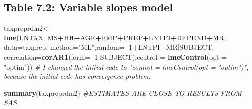\documentclass[]{book}
\newenvironment{Shaded}{\begin{snugshade}}{\end{snugshade}}
\newcommand{\CommentTok}[1]{\textcolor[rgb]{0.56,0.35,0.01}{\textit{#1}}}
\newcommand{\DataTypeTok}[1]{\textcolor[rgb]{0.13,0.29,0.53}{#1}}
\newcommand{\DecValTok}[1]{\textcolor[rgb]{0.00,0.00,0.81}{#1}}
\newcommand{\KeywordTok}[1]{\textcolor[rgb]{0.13,0.29,0.53}{\textbf{#1}}}
\newcommand{\NormalTok}[1]{#1}
\newcommand{\OperatorTok}[1]{\textcolor[rgb]{0.81,0.36,0.00}{\textbf{#1}}}
\newcommand{\StringTok}[1]{\textcolor[rgb]{0.31,0.60,0.02}{#1}}
\begin{document}
\hypertarget{table-7.2-variable-slopes-model}{%
\subsection{Table 7.2: Variable slopes model}\label{table-7.2-variable-slopes-model}}

\begin{Shaded}
\begin{Highlighting}[]
\NormalTok{taxpreprdm2<-}\KeywordTok{lme}\NormalTok{(LNTAX}\OperatorTok{~}\NormalTok{MS}\OperatorTok{+}\NormalTok{HH}\OperatorTok{+}\NormalTok{AGE}\OperatorTok{+}\NormalTok{EMP}\OperatorTok{+}\NormalTok{PREP}\OperatorTok{+}\NormalTok{LNTPI}\OperatorTok{+}\NormalTok{DEPEND}\OperatorTok{+}\NormalTok{MR, }\DataTypeTok{data=}\NormalTok{taxprep, }\DataTypeTok{method=}\StringTok{"ML"}\NormalTok{,}\DataTypeTok{random=}\OperatorTok{~}\DecValTok{1}\OperatorTok{+}\NormalTok{LNTPI}\OperatorTok{+}\NormalTok{MR}\OperatorTok{|}\NormalTok{SUBJECT, }\DataTypeTok{correlation=}\KeywordTok{corAR1}\NormalTok{(}\DataTypeTok{form=}\OperatorTok{~}\DecValTok{1}\OperatorTok{|}\NormalTok{SUBJECT),}\DataTypeTok{control =} \KeywordTok{lmeControl}\NormalTok{(}\DataTypeTok{opt =} \StringTok{"optim"}\NormalTok{))  }
\CommentTok{# I changed the initial code to "control = lmeControl(opt = "optim")", because the initial code has convergence problem.}

\KeywordTok{summary}\NormalTok{(taxpreprdm2) }\CommentTok{#ESTIMATES ARE CLOSE TO RESULTS FROM SAS}
\end{Highlighting}
\end{Shaded}
\end{document}
